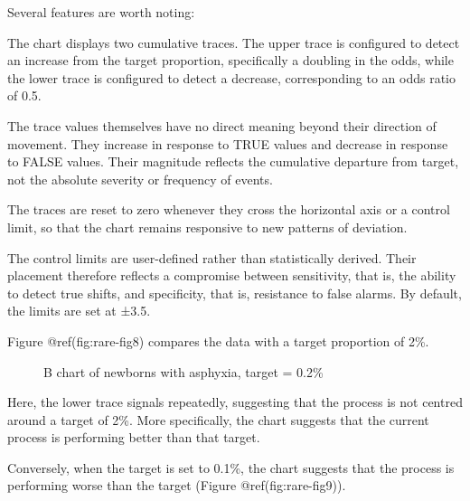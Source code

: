 \documentclass[
]{book}
\makeatletter
\newenvironment{Shaded}{\begin{snugshade}}{\end{snugshade}}
\newcommand{\AttributeTok}[1]{\textcolor[rgb]{0.13,0.29,0.53}{#1}}
\newcommand{\FloatTok}[1]{\textcolor[rgb]{0.00,0.00,0.81}{#1}}
\newcommand{\FunctionTok}[1]{\textcolor[rgb]{0.13,0.29,0.53}{\textbf{#1}}}
\newcommand{\NormalTok}[1]{#1}
\newcommand{\SpecialCharTok}[1]{\textcolor[rgb]{0.81,0.36,0.00}{\textbf{#1}}}
\newcommand*\pandocbounded[1]{%
  \sbox\pandoc@box{#1}%
  \Gscale@div\@tempa{\textheight}{\dimexpr\ht\pandoc@box+\dp\pandoc@box\relax}%
  \Gscale@div\@tempb{\linewidth}{\wd\pandoc@box}%
  \ifdim\@tempb\p@<\@tempa\p@\let\@tempa\@tempb\fi%
  \ifdim\@tempa\p@<\p@\scalebox{\@tempa}{\usebox\pandoc@box}%
  \else\usebox{\pandoc@box}%
  \fi%
}
\makeatother
\begin{document}
Several features are worth noting:

The chart displays two cumulative traces. The upper trace is configured
to detect an increase from the target proportion, specifically a
doubling in the odds, while the lower trace is configured to detect a
decrease, corresponding to an odds ratio of 0.5.

The trace values themselves have no direct meaning beyond their
direction of movement. They increase in response to TRUE values and
decrease in response to FALSE values. Their magnitude reflects the
cumulative departure from target, not the absolute severity or frequency
of events.

The traces are reset to zero whenever they cross the horizontal axis or
a control limit, so that the chart remains responsive to new patterns of
deviation.

The control limits are user-defined rather than statistically derived.
Their placement therefore reflects a compromise between sensitivity,
that is, the ability to detect true shifts, and specificity, that is,
resistance to false alarms. By default, the limits are set at ±3.5.

Figure @ref(fig:rare-fig8) compares the data with a target proportion of
2\%.

\begin{Shaded}
\end{Shaded}

\begin{figure}
\centering
\pandocbounded{}
\caption{B chart of newborns with asphyxia, target = 0.2\%}
\end{figure}

Here, the lower trace signals repeatedly, suggesting that the process is
not centred around a target of 2\%. More specifically, the chart
suggests that the current process is performing better than that target.

Conversely, when the target is set to 0.1\%, the chart suggests that the
process is performing worse than the target (Figure
@ref(fig:rare-fig9)).

\begin{Shaded}
\end{Shaded}
\end{document}
